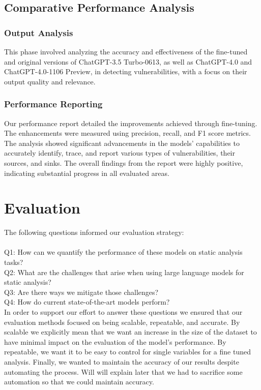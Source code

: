 \documentclass[acmsmall]{acmart}
\begin{document}
\subsection{Comparative Performance Analysis}
\subsubsection{Output Analysis}
This phase involved analyzing the accuracy and effectiveness of the fine-tuned and original versions of ChatGPT-3.5 Turbo-0613, as well as ChatGPT-4.0 and ChatGPT-4.0-1106 Preview, in detecting vulnerabilities, with a focus on their output quality and relevance.
\subsubsection{Performance Reporting}
Our performance report detailed the improvements achieved through fine-tuning. The enhancements were measured using precision, recall, and F1 score metrics. The analysis showed significant advancements in the models' capabilities to accurately identify, trace, and report various types of vulnerabilities, their sources, and sinks. The overall findings from the report were highly positive, indicating substantial progress in all evaluated areas.


\section{Evaluation}
The following questions informed our evaluation strategy:\\
\\
Q1: How can we quantify the performance of these models on static analysis tasks?\\
Q2: What are the challenges that arise when using large language models for static analysis?\\
Q3: Are there ways we mitigate those challenges?\\
Q4: How do current state-of-the-art models perform?\\

In order to support our effort to answer these questions we ensured that our evaluation methods focused on being scalable, repeatable, and accurate. By scalable we explicitly mean that we want an increase in the size of the dataset to have minimal impact on the evaluation of the model's performance. By repeatable, we want it to be easy to control for single variables for a fine tuned analysis. Finally, we wanted to maintain the accuracy of our results despite automating the process. Will will explain later that we had to sacrifice some automation so that we could maintain accuracy.
\end{document}

